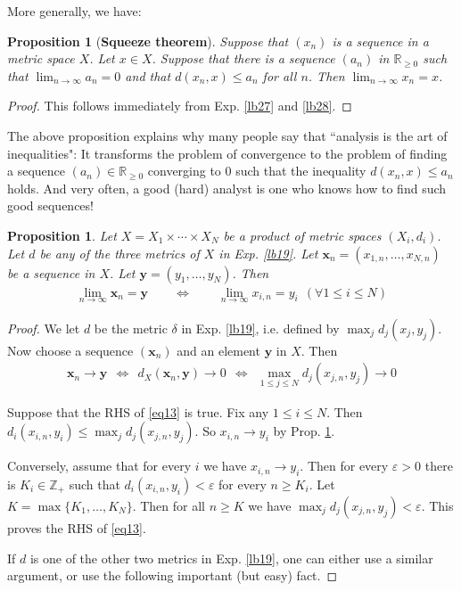 \documentclass[12pt,b5paper,notitlepage]{article}
\theoremstyle{definition}
\theoremstyle{plain}
\newtheorem{pp}[df]{Proposition}
\newcommand{\mbf}{\mathbf}
\newcommand{\Zbb}{\mathbb Z}
\newcommand{\Rbb}{\mathbb R}
\newcommand{\dps}{\displaystyle}
\newcommand{\eps}{\varepsilon}
\numberwithin{equation}{section}
\begin{document}
More generally, we have:

\begin{pp}[\textbf{Squeeze theorem}]\label{lb29}
Suppose that $(x_n)$ is a sequence in a metric space $X$. Let $x\in X$. Suppose that there is a sequence $(a_n)$ in $\Rbb_{\geq 0}$ such that $\dps\lim_{n\rightarrow\infty}a_n=0$ and that $d(x_n,x)\leq a_n$ for all $n$. Then $\dps\lim_{n\rightarrow\infty} x_n=x$.
\end{pp}

\begin{proof}
This follows immediately from Exp. \ref{lb27} and \ref{lb28}.
\end{proof}

The above proposition explains why many people say that ``analysis is the art of inequalities": It transforms the problem of convergence to the problem of finding a sequence $(a_n)\in\Rbb_{\geq 0}$ converging to $0$ such that the inequality $d(x_n,x)\leq a_n$ holds. And very often, a good (hard) analyst is one who knows how to find such good sequences!






\begin{pp}\label{lb38}
Let $X=X_1\times\cdots\times X_N$ be a product of metric spaces $(X_i,d_i)$. Let $d$ be any of the three metrics of $X$ in Exp. \ref{lb19}. Let $\mbf x_n=(x_{1,n},\dots,x_{N,n})$ be a sequence in $X$. Let $\mbf y=(y_1,\dots,y_N)$. Then 
\begin{align*}
\lim_{n\rightarrow\infty} \mbf x_n=\mbf y\qquad\Longleftrightarrow \qquad \lim_{n\rightarrow\infty} x_{i,n}=y_i~~(\forall 1\leq i\leq N)
\end{align*}
\end{pp}

\begin{proof}
We let $d$ be the metric $\delta$ in Exp. \ref{lb19}, i.e. defined by $\max_j d_j(x_j,y_j)$. Now choose a sequence $(\mbf x_n)$ and an element $\mbf y$ in $X$. Then
\begin{align}
\mbf x_n\rightarrow \mbf y~~\Longleftrightarrow~~ d_X(\mbf x_n,\mbf y)\rightarrow 0 ~~\Longleftrightarrow~~ \max_{1\leq j\leq N} d_j(x_{j,n},y_j)\rightarrow 0  \label{eq13}
\end{align}


Suppose that the RHS of \eqref{eq13} is true. Fix any $1\leq i\leq N$. Then $d_i(x_{i,n},y_i)\leq \max_j d_j(x_{j,n},y_j)$. So $x_{i,n}\rightarrow y_i$ by Prop. \ref{lb29}.

Conversely, assume that for every $i$ we have $x_{i,n}\rightarrow y_i$. Then for every $\eps>0$ there is $K_i\in\Zbb_+$ such that $d_i(x_{i,n},y_i)<\varepsilon$ for every $n\geq K_i$. Let $K=\max\{K_1,\dots,K_N\}$. Then for all $n\geq K$ we have $\max_j d_j(x_{j,n},y_j)<\eps$. This proves the RHS of \eqref{eq13}.

If $d$ is one of the other two metrics in Exp. \ref{lb19}, one can either use a similar argument, or use the following important (but easy) fact.
\end{proof}
\end{document}
